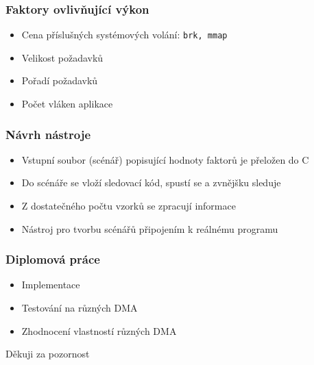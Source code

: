 \documentclass{beamer}
\begin{document}
\begin{frame}
\frametitle{Faktory ovlivňující výkon}
\begin{itemize}
  \item Cena příslušných systémových volání: {\tt brk, mmap}
  \item Velikost požadavků
  \item Pořadí požadavků
  \item Počet vláken aplikace
\end{itemize}
\end{frame}

\begin{frame}
\frametitle{Návrh nástroje}
\begin{itemize}
  \item Vstupní soubor (scénář) popisující hodnoty faktorů je přeložen do C
  \item Do scénáře se vloží sledovací kód, spustí se a zvnějšku sleduje
  \item Z dostatečného počtu vzorků se zpracují informace
  \item Nástroj pro tvorbu scénářů připojením k reálnému programu
\end{itemize}
\end{frame}

\begin{frame}
\frametitle{Diplomová práce}
\begin{itemize}
  \item Implementace
  \item Testování na různých DMA
  \item Zhodnocení vlastností různých DMA
\end{itemize}

\begin{center}
Děkuji za pozornost
\end{center}
\end{frame}
\end{document}
